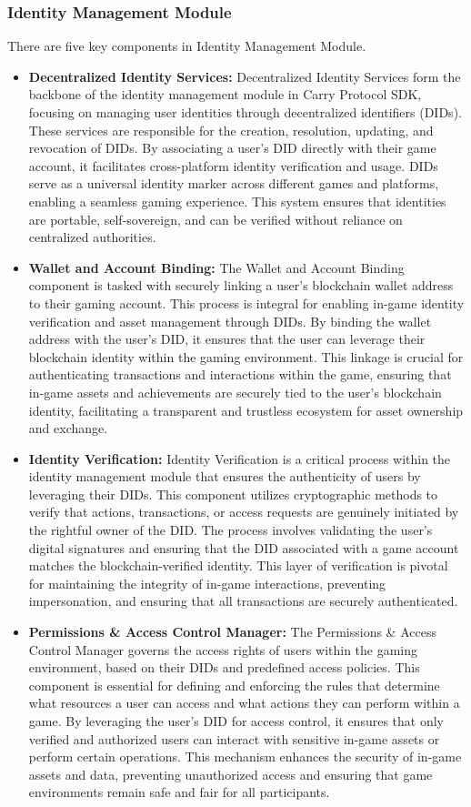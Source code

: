 \subsubsection{Identity Management Module}
There are five key components in Identity Management Module. 
\begin{itemize}
\item \textbf{Decentralized Identity Services:} Decentralized Identity Services form the backbone of the identity management module in Carry Protocol SDK, focusing on managing user identities through decentralized identifiers (DIDs). These services are responsible for the creation, resolution, updating, and revocation of DIDs. By associating a user's DID directly with their game account, it facilitates cross-platform identity verification and usage. DIDs serve as a universal identity marker across different games and platforms, enabling a seamless gaming experience. This system ensures that identities are portable, self-sovereign, and can be verified without reliance on centralized authorities.
\item \textbf{Wallet and Account Binding:} The Wallet and Account Binding component is tasked with securely linking a user's blockchain wallet address to their gaming account. This process is integral for enabling in-game identity verification and asset management through DIDs. By binding the wallet address with the user's DID, it ensures that the user can leverage their blockchain identity within the gaming environment. This linkage is crucial for authenticating transactions and interactions within the game, ensuring that in-game assets and achievements are securely tied to the user's blockchain identity, facilitating a transparent and trustless ecosystem for asset ownership and exchange.
\item \textbf{Identity Verification:} Identity Verification is a critical process within the identity management module that ensures the authenticity of users by leveraging their DIDs. This component utilizes cryptographic methods to verify that actions, transactions, or access requests are genuinely initiated by the rightful owner of the DID. The process involves validating the user's digital signatures and ensuring that the DID associated with a game account matches the blockchain-verified identity. This layer of verification is pivotal for maintaining the integrity of in-game interactions, preventing impersonation, and ensuring that all transactions are securely authenticated.
\item \textbf{Permissions \& Access Control Manager:} The Permissions \& Access Control Manager governs the access rights of users within the gaming environment, based on their DIDs and predefined access policies. This component is essential for defining and enforcing the rules that determine what resources a user can access and what actions they can perform within a game. By leveraging the user's DID for access control, it ensures that only verified and authorized users can interact with sensitive in-game assets or perform certain operations. This mechanism enhances the security of in-game assets and data, preventing unauthorized access and ensuring that game environments remain safe and fair for all participants.
\end{itemize}


